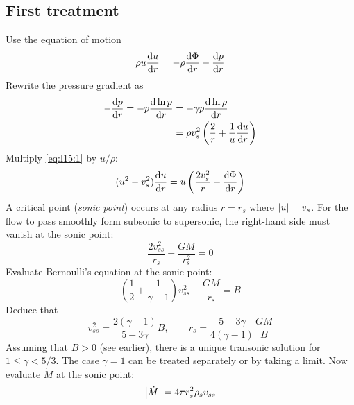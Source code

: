 \documentclass{jknotes}
\begin{document}
\subsection{First treatment}
Use the equation of motion
\begin{equation}
	\rho u \frac{\diffd u}{\diffd r} = -\rho \frac{\diffd \Phi}{\diffd r} -
	\frac{\diffd p}{\diffd r} \label{eq:l15:1}
\end{equation}
Rewrite the pressure gradient as
\begin{align}
	-\frac{\diffd p}{\diffd r} = -p \frac{\diffd \ln p}{\diffd r} 
	&= -\gamma p \frac{\diffd \ln \rho}{\diffd r} \\
	&= \rho v_s^2 \left( \frac{2}{r} + \frac{1}{u}\frac{\diffd u}{\diffd
	r}\right)
\end{align}
Multiply \eqref{eq:l15:1} by $u/\rho$:
\begin{equation}
	(u^2 - v_s^2)\frac{\diffd u}{\diffd r} = u \left( \frac{2v_s^2}{r} -
	\frac{\diffd \Phi}{\diffd r}\right)
\end{equation}
A critical point (\emph{sonic point}) occurs at any radius $r=r_s$ where
$\abs{u} = v_s$. For the flow to pass smoothly form subsonic to supersonic,
the right-hand side must vanish at the sonic point:
\begin{equation}
	\frac{2v_{ss}^2}{r_s} - \frac{GM}{r_s^2} = 0
\end{equation}
Evaluate Bernoulli's equation at the sonic point:
\begin{equation}
	\left(\frac{1}{2} + \frac{1}{\gamma -1}\right) v_{ss}^2 - \frac{GM}{r_s} =
	B
\end{equation}
Deduce that
\begin{equation}
	v_{ss}^2 = \frac{2(\gamma -1)}{5-3\gamma}B, \hspace{2em} r_s =
	\frac{5-3\gamma}{4(\gamma-1)} \frac{GM}{B}
\end{equation}
Assuming that $B > 0$ (see earlier), there is a unique transonic solution for
$1 \le \gamma < 5/3$. The case $\gamma =1$ can be treated separately or by
taking a limit. Now evaluate $\dot{M}$ at the sonic point:
\begin{equation}
	\abs{\dot{M}} = 4\pi r_s^2 \rho_s v_{ss}
\end{equation}
\end{document}
